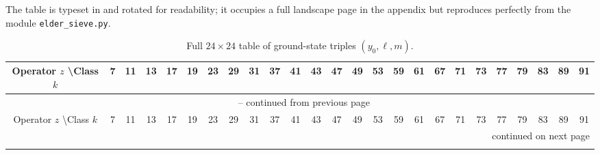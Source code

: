 \documentclass[11pt,a4paper]{article}
\begin{document}
The table is typeset in \texttt{\tiny} and rotated for readability; it occupies a full landscape page in the appendix but reproduces perfectly from the module \texttt{elder\_sieve.py}.

\begin{landscape}
\tiny
\begin{longtable}{c|*{24}{c}}
\caption{Full \(24 \times 24\) table of ground-state triples \((y_0, \ell, m)\).} \label{tab:full-ym-pair} \\
\toprule
Operator \(z\) \textbackslash Class \(k\) & 7 & 11 & 13 & 17 & 19 & 23 & 29 & 31 & 37 & 41 & 43 & 47 & 49 & 53 & 59 & 61 & 67 & 71 & 73 & 77 & 79 & 83 & 89 & 91 \\
\midrule
\endfirsthead

\multicolumn{25}{c}{\tablename\ \thetable{} -- continued from previous page} \\
\toprule
Operator \(z\) \textbackslash Class \(k\) & 7 & 11 & 13 & 17 & 19 & 23 & 29 & 31 & 37 & 41 & 43 & 47 & 49 & 53 & 59 & 61 & 67 & 71 & 73 & 77 & 79 & 83 & 89 & 91 \\
\midrule
\endhead

\midrule
\multicolumn{25}{r}{continued on next page} \\
\endfoot

\bottomrule
\endlastfoot


\end{longtable}
\end{landscape}
\end{document}
